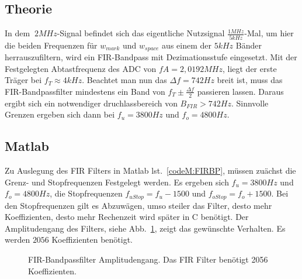 \documentclass{article}
\begin{document}
\subsection{Theorie}
In dem $~2MHz$-Signal befindet sich das eigentliche Nutzsignal $\frac{1MHz}{5kHz}$-Mal, um hier die beiden Frequenzen für $w_{mark}$ und $w_{space}$
aus einem der $5kHz$ Bänder herrauszufiltern, wird ein FIR-Bandpass mit Dezimationsstufe eingesetzt. Mit der Festgelegten Abtastfrequenz des ADC von $fA = 2,0192MHz$,
liegt der erste Träger bei $f_T \approx 4kHz$. Beachtet man nun das $\varDelta f = 742Hz$ breit ist, muss das FIR-Bandpassfilter mindestens ein Band von
$f_T \pm \frac{\varDelta f}{2}$ passieren lassen. Daraus ergibt sich ein notwendiger druchlassbereich von $B_{FIR} > 742Hz$. 
Sinnvolle Grenzen ergeben sich dann bei $f_u = 3800Hz$ und $f_o = 4800Hz$.


\subsection{Matlab}
Zu Auslegung des FIR Filters in Matlab lst.~\ref{codeM:FIRBP}, müssen zuächst die Grenz- und Stopfrequenzen Festgelegt werden.
Es ergeben sich $f_u = 3800Hz$ und $f_o = 4800Hz$, die Stopfrequenzen $f_{uStop} = f_u - 1500$ und $f_{oStop} = f_o + 1500$.
Bei den Stopfrequenzen gilt es Abzuwägen, umso steiler das Filter, desto mehr Koeffizienten, desto mehr Rechenzeit wird später in C
benötigt.
Der Amplitudengang des Filters, siehe Abb.~\ref{fig:fir_ampli}, zeigt das gewünschte Verhalten. Es werden $2056$ Koeffizienten benötigt.


\begin{figure}[!h]
    \label{fig:fir_ampli}
    \centering
    \def\svgscale{0.3}
    \def\svgwidth{\columnwidth}
    
    \caption{FIR-Bandpassfilter Amplitudengang. Das FIR Filter benötigt 2056 Koeffizienten.}
\end{figure}
%
%
\end{document}
